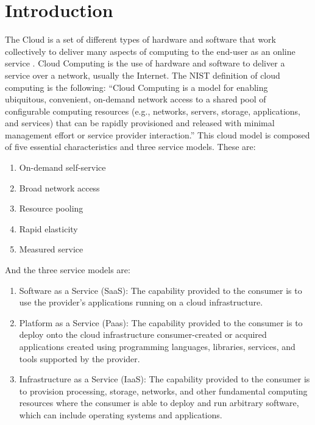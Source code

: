 \chapter{Introduction}\label{ch:introduction}
The Cloud is a set of different types of hardware and software that work collectively to deliver many aspects of computing to the end-user as an online service \cite{lenovo_cloud}. Cloud Computing is the use of hardware and software to deliver a service over a network, usually the Internet. The NIST definition of cloud computing is the following: ``Cloud Computing is a model for enabling ubiquitous, convenient, on-demand network access to a shared pool of configurable computing resources (e.g., networks, servers, storage, applications, and services) that can be rapidly provisioned and released with minimal management effort or service provider interaction.''\cite{nist:cloud_computing} This cloud model is composed of five essential characteristics and three service models. These are:
\begin{enumerate}
    \item On-demand self-service
    \item Broad network access
    \item Resource pooling
    \item Rapid elasticity
    \item Measured service
\end{enumerate}

\noindent
And the three service models are:
\begin{enumerate}
    \item Software as a Service (SaaS): The capability provided to the consumer is to use the provider's applications running on a cloud infrastructure.
    \item Platform as a Service (Paas): The capability provided to the consumer is to deploy onto the cloud infrastructure consumer-created or acquired applications created using programming languages, libraries, services, and tools supported by the provider.
    \item Infrastructure as a Service (IaaS): The capability provided to the consumer is to provision processing, storage, networks, and other fundamental computing resources where the consumer is able to deploy and run arbitrary software, which can include operating systems and applications.
\end{enumerate}

